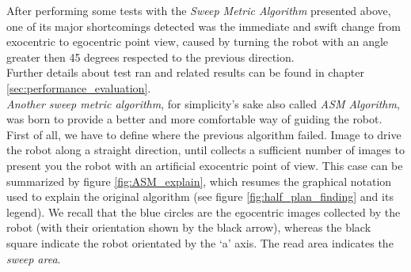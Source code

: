 After performing some tests with the \textit{Sweep Metric
Algorithm} presented above, one of its major shortcomings
detected was the immediate and swift change from exocentric
to egocentric point view, caused by turning the robot
with an angle greater then 45 degrees respected to the previous direction.
\\
Further details about test ran and related results can be
found in chapter \ref{sec:performance_evaluation}.
\\
\textit{Another sweep metric algorithm}, for simplicity's
sake also called \textit{ASM Algorithm}, was born to provide
a better and more comfortable way of guiding the robot.
\\
First of all, we have to define where the previous algorithm
failed. Image to drive the robot along a straight direction,
until \framework{} collects a sufficient number of images to
present you the robot with an artificial exocentric point of
view. This case can be summarized by figure \ref{fig:ASM_explain},
which resumes the graphical notation
used to explain the original algorithm (see figure
\ref{fig:half_plan_finding} and its legend). We recall
that the blue circles are the egocentric images collected
by the robot (with their orientation shown by the black
arrow), whereas the black square indicate the robot orientated
by the `a' axis. The read area indicates the \textit{sweep area}.
